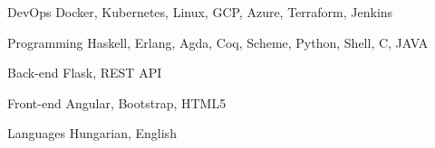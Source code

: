 

\begin{cvskills}

  \cvskill
    {DevOps} %
    {Docker, Kubernetes, Linux, GCP, Azure, Terraform, Jenkins} %

  \cvskill
    {Programming} %
    {Haskell, Erlang, Agda, Coq, Scheme, Python, Shell, C, JAVA} %

  \cvskill
    {Back-end} %
    {Flask, REST API} %

  \cvskill
    {Front-end} %
    {Angular, Bootstrap, HTML5} %

  \cvskill
    {Languages} %
    {Hungarian, English} %

\end{cvskills}
